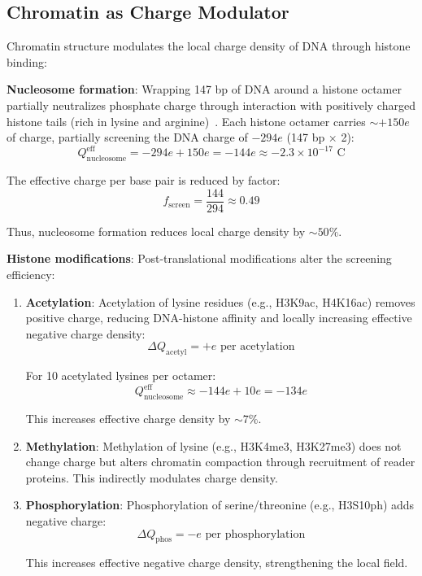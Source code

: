\documentclass[twocolumn,10pt,aps,prd,superscriptaddress,floatfix,nofootinbib]{revtex4-2}
\theoremstyle{remark}
\begin{document}
\subsection{Chromatin as Charge Modulator}

Chromatin structure modulates the local charge density of DNA through histone binding:

\textbf{Nucleosome formation}: Wrapping 147 bp of DNA around a histone octamer partially neutralizes phosphate charge through interaction with positively charged histone tails (rich in lysine and arginine)~\cite{Luger1997}. Each histone octamer carries $\sim +150e$ of charge, partially screening the DNA charge of $-294e$ (147 bp $\times$ 2):
\begin{equation}
Q_{\mathrm{nucleosome}}^{\mathrm{eff}} = -294e + 150e = -144e \approx -2.3 \times 10^{-17} \text{ C}
\end{equation}

The effective charge per base pair is reduced by factor:
\begin{equation}
f_{\mathrm{screen}} = \frac{144}{294} \approx 0.49
\end{equation}

Thus, nucleosome formation reduces local charge density by $\sim 50\%$.

\textbf{Histone modifications}: Post-translational modifications alter the screening efficiency:

\begin{enumerate}
\item \textbf{Acetylation}: Acetylation of lysine residues (e.g., H3K9ac, H4K16ac) removes positive charge, reducing DNA-histone affinity and locally increasing effective negative charge density:
\begin{equation}
\Delta Q_{\mathrm{acetyl}} = +e \text{ per acetylation}
\end{equation}

For 10 acetylated lysines per octamer:
\begin{equation}
Q_{\mathrm{nucleosome}}^{\mathrm{eff}} \approx -144e + 10e = -134e
\end{equation}

This increases effective charge density by $\sim 7\%$.

\item \textbf{Methylation}: Methylation of lysine (e.g., H3K4me3, H3K27me3) does not change charge but alters chromatin compaction through recruitment of reader proteins. This indirectly modulates charge density.

\item \textbf{Phosphorylation}: Phosphorylation of serine/threonine (e.g., H3S10ph) adds negative charge:
\begin{equation}
\Delta Q_{\mathrm{phos}} = -e \text{ per phosphorylation}
\end{equation}

This increases effective negative charge density, strengthening the local field.
\end{enumerate}
\end{document}
